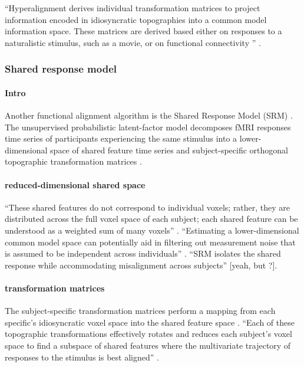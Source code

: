 %
``Hyperalignment derives individual transformation matrices to project
information encoded in idiosyncratic topographies into a common model
information space. These matrices are derived based either on responses to a
naturalistic stimulus, such as a movie, or on functional connectivity
\citep{guntupalli2018computational}'' \citep{jiahui2020predicting}.


\subsubsection{Shared response model}

\paragraph{Intro}

Another functional alignment algorithm is the Shared Response Model (SRM)
\citep{chen2015reduced, richard2019fast}.
%
The unsupervised probabilistic latent-factor model decomposes fMRI responses
time series of participants experiencing the same stimulus into a
lower-dimensional space of shared feature time series and subject-specific
orthogonal topographic transformation matrices \citep{kumar2020brainiak,
cohen2017computational}.


\paragraph{reduced-dimensional shared space}
%
``These shared features do not correspond to individual voxels; rather, they are
distributed across the full voxel space of each subject; each shared feature can
be understood as a weighted sum of many voxels'' \citep{kumar2020brainiak}.
%
``Estimating a lower-dimensional common model space can potentially aid in
filtering out measurement noise that is assumed to be independent across
individuals'' \citep{chang2021endogenous}.
%
``SRM isolates the shared response while accommodating misalignment across
subjects'' \citep{kumar2020brainiak} [yeah, but \citep{nastase2019leveraging}?].


\paragraph{transformation matrices}
%
The subject-specific transformation matrices perform a mapping from each
specific's idiosyncratic voxel space into the shared feature space
\citep{kumar2020brainiak, cohen2017computational}.
%
``Each of these topographic transformations effectively rotates and reduces each
subject's voxel space to find a subspace of shared features where the
multivariate trajectory of responses to the stimulus is best aligned''
\citep{kumar2020brainiak}.


